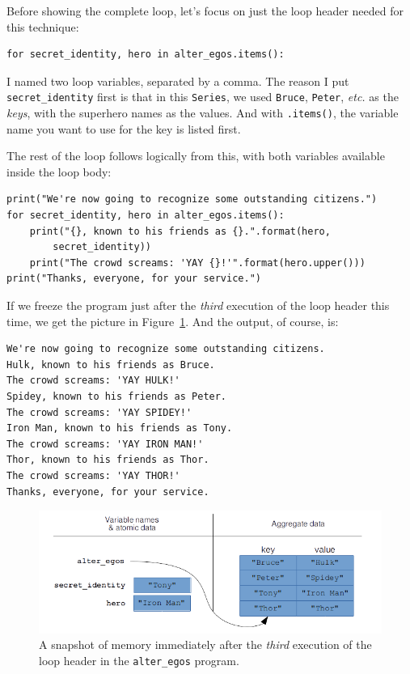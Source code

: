 Before showing the complete loop, let's focus on just the loop header needed
for this technique:

\begin{Verbatim}[fontsize=\normalsize,samepage=true,frame=single,framesep=3mm]
for secret_identity, hero in alter_egos.items():
\end{Verbatim}

I named two loop variables, separated by a comma. The reason I put
\texttt{secret\_identity} first is that in this \texttt{Series}, we used
\texttt{Bruce}, \texttt{Peter}, \textit{etc.} as the \textit{keys}, with the
superhero names as the values. And with \texttt{.items()}, the variable name
you want to use for the key is listed first.

The rest of the loop follows logically from this, with both variables available
inside the loop body:

\begin{Verbatim}[fontsize=\footnotesize,samepage=true,frame=single,framesep=3mm]
print("We're now going to recognize some outstanding citizens.")
for secret_identity, hero in alter_egos.items():
    print("{}, known to his friends as {}.".format(hero,
        secret_identity))
    print("The crowd screams: 'YAY {}!'".format(hero.upper()))
print("Thanks, everyone, for your service.")
\end{Verbatim}

If we freeze the program just after the \textit{third} execution of the loop
header this time, we get the picture in Figure~\ref{fig:loopsMemory2}. And the
output, of course, is:

\begin{Verbatim}[fontsize=\small,samepage=true,frame=leftline,framesep=5mm,framerule=1mm]
We're now going to recognize some outstanding citizens.
Hulk, known to his friends as Bruce.
The crowd screams: 'YAY HULK!'
Spidey, known to his friends as Peter.
The crowd screams: 'YAY SPIDEY!'
Iron Man, known to his friends as Tony.
The crowd screams: 'YAY IRON MAN!'
Thor, known to his friends as Thor.
The crowd screams: 'YAY THOR!'
Thanks, everyone, for your service.
\end{Verbatim}

\begin{figure}[ht]
\centering
\includegraphics[width=1\textwidth]{loopsMemory2.png}
\caption{A snapshot of memory immediately after the \textit{third} execution
of the loop header in the \texttt{alter\_egos} program.}
\label{fig:loopsMemory2}
\end{figure}

